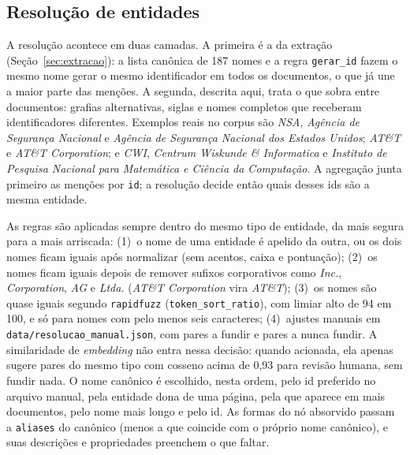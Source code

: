 \subsection{Resolução de entidades}

A resolução acontece em duas camadas. A primeira é a da extração (Seção~\ref{sec:extracao}): a lista canônica de 187 nomes e a regra \texttt{gerar\_id} fazem o mesmo nome gerar o mesmo identificador em todos os documentos, o que já une a maior parte das menções. A segunda, descrita aqui, trata o que sobra entre documentos: grafias alternativas, siglas e nomes completos que receberam identificadores diferentes. Exemplos reais no corpus são \emph{NSA}, \emph{Agência de Segurança Nacional} e \emph{Agência de Segurança Nacional dos Estados Unidos}; \emph{AT\&T} e \emph{AT\&T Corporation}; e \emph{CWI}, \emph{Centrum Wiskunde \& Informatica} e \emph{Instituto de Pesquisa Nacional para Matemática e Ciência da Computação}. A agregação junta primeiro as menções por \texttt{id}; a resolução decide então quais desses ids são a mesma entidade.

As regras são aplicadas sempre dentro do mesmo tipo de entidade, da mais segura para a mais arriscada: (1)~o nome de uma entidade é apelido da outra, ou os dois nomes ficam iguais após normalizar (sem acentos, caixa e pontuação); (2)~os nomes ficam iguais depois de remover sufixos corporativos como \emph{Inc.}, \emph{Corporation}, \emph{AG} e \emph{Ltda.} (\emph{AT\&T Corporation} vira \emph{AT\&T}); (3)~os nomes são quase iguais segundo \texttt{rapidfuzz} (\texttt{token\_sort\_ratio}), com limiar alto de 94 em 100, e só para nomes com pelo menos seis caracteres; (4)~ajustes manuais em \texttt{data/resolucao\_manual.json}, com pares a fundir e pares a nunca fundir. A similaridade de \emph{embedding} não entra nessa decisão: quando acionada, ela apenas sugere pares do mesmo tipo com cosseno acima de 0,93 para revisão humana, sem fundir nada. O nome canônico é escolhido, nesta ordem, pelo id preferido no arquivo manual, pela entidade dona de uma página, pela que aparece em mais documentos, pelo nome mais longo e pelo id. As formas do nó absorvido passam a \texttt{aliases} do canônico (menos a que coincide com o próprio nome canônico), e suas descrições e propriedades preenchem o que faltar.

